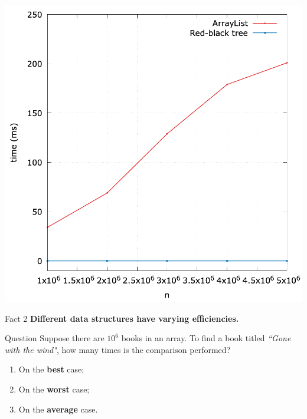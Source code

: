 \documentclass[aspectratio=169, 14pt]{beamer}
\begin{document}
\begin{frame}
    \begin{center}
        \includegraphics[height=0.75\paperheight]{week0/rb-time}
    \end{center}
    \begin{block}{Fact 2}
        \textbf{Different data structures have varying \alert{efficiencies}.}
    \end{block} 
\end{frame}

\begin{frame}
    \begin{exampleblock}{Question}
        Suppose there are $10^6$ books in an array. To find a book titled \emph{``Gone with the wind"}, how many times is the comparison performed?
        \begin{enumerate}
            \item On the \textbf{best} case; 
            \item On the \textbf{worst} case; 
            \item On the \textbf{average} case. 
        \end{enumerate}
    \end{exampleblock}
\end{frame}
\end{document}
